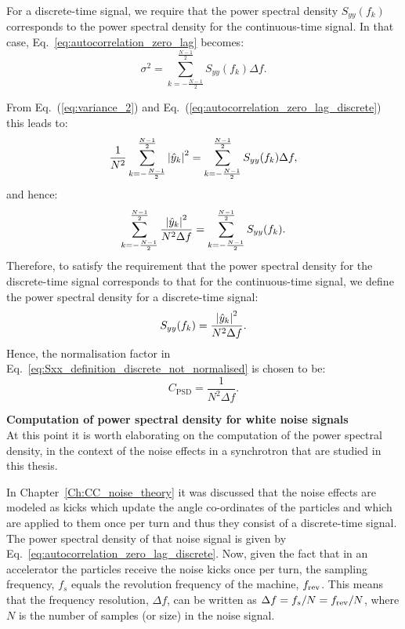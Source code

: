 For a discrete-time signal, we require that the power spectral density $S_{yy}(f_k)$ corresponds to the power spectral density for the continuous-time signal. In that case, Eq.~\eqref{eq:autocorrelation_zero_lag}
becomes:
\begin{equation}\label{eq:autocorrelation_zero_lag_discrete}
\sigma^2 =  \sum_{k=-\frac{N-1}{2}}^{\frac{N-1}{2}} S_{yy}(f_k) \Delta f.
\end{equation}

From Eq.~(\ref{eq:variance_2}) and Eq.~(\ref{eq:autocorrelation_zero_lag_discrete}) this leads to:
\begin{equation}\label{eq:normalisation_test}
 \frac{1}{N^2}\sum_{k=-\frac{N-1}{2}}^{\frac{N-1}{2}} \left | \hat{y}_k \right |^2 =  \sum_{k=-\frac{N-1}{2}}^{\frac{N-1}{2}} S_{yy}(f_k) \Delta f,
\end{equation} %
and hence:
\begin{equation}
  \sum_{k=-\frac{N-1}{2}}^{\frac{N-1}{2}} \frac{\left | \hat{y}_k \right |^2}{N^2 \Delta f} =  \sum_{k=-\frac{N-1}{2}}^{\frac{N-1}{2}} S_{yy}(f_k).
\end{equation}
Therefore, to satisfy the requirement that the power spectral density for the discrete-time signal corresponds to that for the continuous-time signal, we define the power spectral density for a discrete-time signal:
\begin{equation}
    S_{yy}(f_k) = \frac{\left | \hat{y}_k \right |^2}{N^2 \Delta f}.
\end{equation}
Hence, the normalisation factor in Eq.~\eqref{eq:Sxx_definition_discrete_not_normalised} is chosen to be:
\begin{equation}
    C_\mathrm{PSD}=\frac{1}{N^2 \Delta f}.
\end{equation}

\textbf{Computation of power spectral density for white noise signals}\\
At this point it is worth elaborating on the computation of the power spectral density, in the context of the noise effects in a synchrotron that are studied in this thesis.

In Chapter~\ref{Ch:CC_noise_theory} it was discussed that the noise effects are modeled as kicks which update the angle co-ordinates of the particles and which are applied to them once per turn and thus they consist of a discrete-time signal. The power spectral density of that noise signal is given by Eq.~\eqref{eq:autocorrelation_zero_lag_discrete}.  Now, given the fact that in an accelerator the particles receive the noise kicks once per turn, the sampling frequency, $f_s$ equals the revolution frequency of the machine, ${f_\mathrm{rev}}$. This means that the frequency resolution, $\Delta f$, can be written as $\Delta f = f_s/N = {f_\mathrm{rev}}/N$, where $N$ is the number of samples (or size) in the noise signal. 

